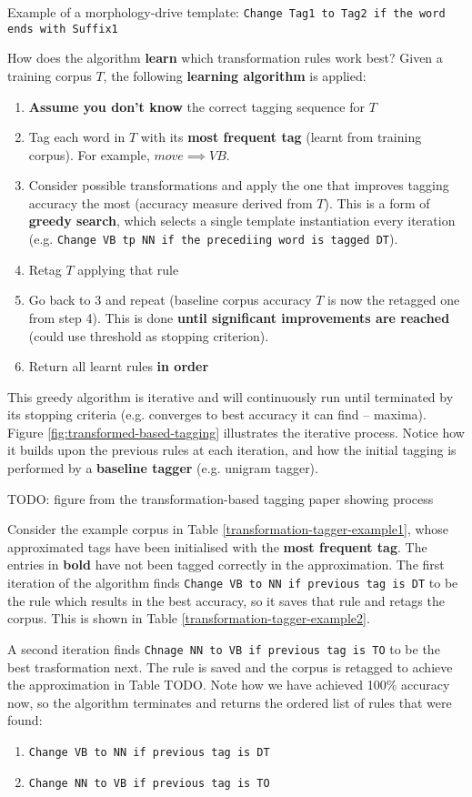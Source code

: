 \documentclass{article}
\begin{document}
Example of a morphology-drive template: \texttt{Change Tag1 to Tag2 if the word ends with Suffix1}

How does the algorithm \textbf{learn} which transformation rules work best? Given a training corpus $T$, the following \textbf{learning algorithm} is applied:
\begin{enumerate}
	\item \textbf{Assume you don't know} the correct tagging sequence for $T$
	\item Tag each word in $T$  with its \textbf{most frequent tag} (learnt from training corpus). For example, $move \implies VB$.
	\item Consider  possible transformations and apply the one that improves tagging accuracy the most (accuracy measure derived from $T$). This is a form of \textbf{greedy search}, which selects a single template instantiation every iteration (e.g. \texttt{Change VB tp NN if the precediing word is tagged DT}).
	\item Retag $T$ applying that rule
	\item Go back to 3 and repeat (baseline corpus accuracy $T$ is now the retagged one from step 4). This is done \textbf{until significant improvements are reached} (could use threshold as stopping criterion).
	\item Return all learnt rules \textbf{in order}
\end{enumerate}
This greedy algorithm is iterative and will continuously run until terminated by its stopping criteria (e.g. converges to best accuracy it can find -- maxima). Figure \ref{fig:transformed-based-tagging} illustrates the iterative process. Notice how it builds upon the previous rules at each iteration, and how the initial tagging is performed by a \textbf{baseline tagger} (e.g. unigram tagger).

TODO: figure from the transformation-based tagging paper showing process

Consider the example corpus in Table \ref{transformation-tagger-example1}, whose approximated tags have been initialised with the \textbf{most frequent tag}. The entries in \textbf{bold} have not been tagged correctly in the approximation. The first iteration of the algorithm finds \texttt{Change VB to NN if previous tag is DT} to be the rule which results in the best accuracy, so it saves that rule and retags the corpus. This is shown in  Table \ref{transformation-tagger-example2}.

A second iteration finds \texttt{Chnage NN to VB if previous tag is TO} to be the best trasformation next. The rule is saved and the corpus is retagged to achieve the approximation in Table TODO. Note how we have achieved 100\% accuracy now, so the algorithm terminates and returns the ordered list of rules that were found:
\begin{enumerate}
	\item \texttt{Change VB to NN if previous tag is DT}
	\item \texttt{Change NN to VB if previous tag is TO}
\end{enumerate}
\end{document}
